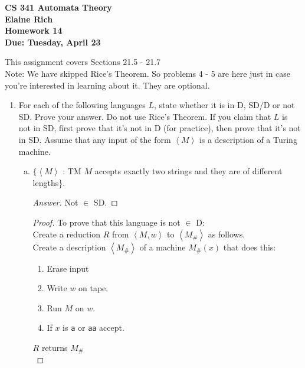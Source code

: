 \documentclass[10pt]{article}
\newcommand{\brackets}[1]{\left< #1 \right>}
\begin{document}
\begin{center}
\textbf{
CS 341 Automata Theory \\
Elaine Rich \\
Homework 14 \\
Due: Tuesday, April 23}\\
\end{center}

\noindent
This assignment covers Sections 21.5 - 21.7\\

\noindent
Note: We have skipped Rice's Theorem. So problems 4 - 5 are here just in case you're interested in learning about it. They are optional.

\begin{enumerate}[1)]


\item
For each of the following languages $L$, state whether it is in D, SD/D or not SD. Prove your answer. Do not use Rice's Theorem. If you claim that $L$ is not in SD, first prove that it's not in D (for practice), then prove that it's not in SD. Assume that any input of the form $\brackets{M}$ is a description of a Turing machine.
\begin{enumerate}[a)]

\item
$\{\brackets{M}$ : TM $M$ accepts exactly two strings and they are of different lengths\}.
\begin{proof}[Answer]
Not $\in$ SD.
\end{proof}
\begin{proof}[Proof]
To prove that this language is not $\in$ D:\\
Create a reduction $R$ from $\brackets{M, w}$ to $\brackets{M_\#}$ as follows.\\
Create a description $\brackets{M_\#}$ of a machine $M_\#(x)$ that does this: \\
\begin{center}
\begin{enumerate}[1.]
\item
Erase input

\item
Write $w$ on tape.

\item
Run $M$ on $w$.

\item
If $x$ is \texttt{a} or \texttt{aa} accept.
\end{enumerate}
\end{center}
$R$ returns $M_\#$\\


\end{proof}
\end{enumerate}
\end{enumerate}
\end{document}
